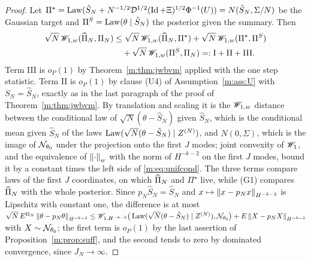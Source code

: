 \begin{proof}
Let $\Pi^\star=\operatorname{Law}(\hat S_N+N^{-1/2}\mathcal D^{1/2}(\operatorname{Id}+\Xi)^{1/2}\Phi^{-1}(U))=N(\hat S_N,\Sigma/N)$ be the Gaussian target and $\Pi^{S}=\operatorname{Law}(\theta\mid\hat S_N)$ the posterior given the summary. Then
\[
\begin{aligned}
\sqrt N\,\mathscr{W}_{1,w}(\widehat\Pi_N,\Pi_N)&\le\sqrt N\,\mathscr{W}_{1,w}(\widehat\Pi_N,\Pi^\star)+\sqrt N\,\mathscr{W}_{1,w}(\Pi^\star,\Pi^S)\\
&\quad+\sqrt N\,\mathscr{W}_{1,w}(\Pi^S,\Pi_N)=:\mathrm I+\mathrm{II}+\mathrm{III}.
\end{aligned}
\]
Term III is $o_P(1)$ by Theorem~\ref{m:thm:jwbvm} applied with the one step statistic. Term II is $o_P(1)$ by clause (U4) of Assumption~\ref{m:ass:U} with $S_N=\hat S_N$, exactly as in the last paragraph of the proof of Theorem~\ref{m:thm:jwbvm}. By translation and scaling it is the $\mathscr{W}_{1,w}$ distance between the conditional law of $\sqrt N(\theta-\hat S_N)$ given $\hat S_N$, which is the conditional mean given $\hat S_N$ of the laws $\operatorname{Law}(\sqrt N(\theta-\hat S_N)\mid Z^{(N)})$, and $N(0,\Sigma)$, which is the image of $\mathcal{N}_{\theta_0}$ under the projection onto the first $J$ modes; joint convexity of $\mathscr{W}_1$, and the equivalence of $\left\|\cdot\right\|_w$ with the norm of $H^{-k-2}$ on the first $J$ modes, bound it by a constant times the left side of \eqref{m:eq:unifcond}. The three terms compare laws of the first $J$ coordinates, on which $\widehat\Pi_N$ and $\Pi^\star$ live, while (G1) compares $\widehat\Pi_N$ with the whole posterior. Since $p_N\hat S_N=\hat S_N$ and $x\mapsto\left\|x-p_Nx\right\|_{H^{-k-2}}$ is Lipschitz with constant one, the difference is at most $\sqrt N\,E^{\Pi_N}\left\|\theta-p_N\theta\right\|_{H^{-k-2}}\le\mathscr{W}_{1,H^{-k-2}}\big(\operatorname{Law}(\sqrt N(\theta-\hat S_N)\mid Z^{(N)}),\mathcal{N}_{\theta_0}\big)+E\left\|X-p_NX\right\|_{H^{-k-2}}$ with $X\sim\mathcal{N}_{\theta_0}$; the first term is $o_P(1)$ by the last assertion of Proposition~\ref{m:prop:suff}, and the second tends to zero by dominated convergence, since $J_N\to\infty$.


\end{proof}
